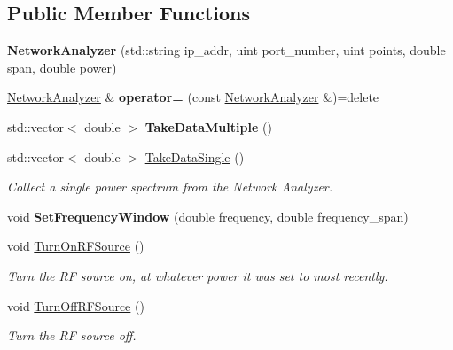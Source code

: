\subsection*{Public Member Functions}
\begin{DoxyCompactItemize}
\item 
{\bfseries Network\+Analyzer} (std\+::string ip\+\_\+addr, uint port\+\_\+number, uint points, double span, double power)\hypertarget{class_network_analyzer_a1d8a2de50a5079e392e912e3bc25cbbb}{}\label{class_network_analyzer_a1d8a2de50a5079e392e912e3bc25cbbb}

\item 
\hyperlink{class_network_analyzer}{Network\+Analyzer} \& {\bfseries operator=} (const \hyperlink{class_network_analyzer}{Network\+Analyzer} \&)=delete\hypertarget{class_network_analyzer_a2785c012d28fb621e7218a9e471716e3}{}\label{class_network_analyzer_a2785c012d28fb621e7218a9e471716e3}

\item 
std\+::vector$<$ double $>$ {\bfseries Take\+Data\+Multiple} ()\hypertarget{class_network_analyzer_a667cf86a80639bb57c67061b7c9df210}{}\label{class_network_analyzer_a667cf86a80639bb57c67061b7c9df210}

\item 
std\+::vector$<$ double $>$ \hyperlink{class_network_analyzer_aa7ae9c649f4d7a5828e2d24ad8dee65d}{Take\+Data\+Single} ()
\begin{DoxyCompactList}\small\item\em Collect a single power spectrum from the Network Analyzer. \end{DoxyCompactList}\item 
void {\bfseries Set\+Frequency\+Window} (double frequency, double frequency\+\_\+span)\hypertarget{class_network_analyzer_a65864fe6142eadfd8e3e976e592e4bf0}{}\label{class_network_analyzer_a65864fe6142eadfd8e3e976e592e4bf0}

\item 
void \hyperlink{class_network_analyzer_a6d4e76a043fd30788167c4c0e187ed00}{Turn\+On\+R\+F\+Source} ()\hypertarget{class_network_analyzer_a6d4e76a043fd30788167c4c0e187ed00}{}\label{class_network_analyzer_a6d4e76a043fd30788167c4c0e187ed00}

\begin{DoxyCompactList}\small\item\em Turn the RF source on, at whatever power it was set to most recently. \end{DoxyCompactList}\item 
void \hyperlink{class_network_analyzer_aeeb9823df08d7b602d524583fcc94c26}{Turn\+Off\+R\+F\+Source} ()\hypertarget{class_network_analyzer_aeeb9823df08d7b602d524583fcc94c26}{}\label{class_network_analyzer_aeeb9823df08d7b602d524583fcc94c26}

\begin{DoxyCompactList}\small\item\em Turn the RF source off. \end{DoxyCompactList}\end{DoxyCompactItemize}

